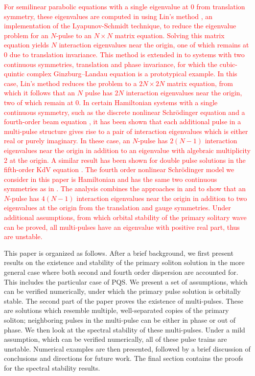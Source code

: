 \documentclass[12pt]{elsarticle}
\newcommand{\revised}[1]{ \textcolor{red}{#1} }
\begin{document}
\revised{For semilinear parabolic equations with a single eigenvalue at 0 from translation symmetry, these eigenvalues are computed in \cite{Sandstede1998} using Lin's method \cite{Lin1990}, an implementation of the Lyapunov-Schmidt technique, to reduce the eigenvalue problem for an $N$-pulse to an $N\times N$ matrix equation. Solving this matrix equation yields $N$ interaction eigenvalues near the origin, one of which remains at 0 due to translation invariance. This method is extended in \cite{Manukian} to systems with two continuous symmetries, translation and phase invariance, for which the cubic-quintic complex Ginzburg–Landau equation is a prototypical example. In this case, Lin's method reduces the problem to a $2N\times 2N$ matrix equation, from which it follows that an $N$ pulse has $2N$ interaction eigenvalues near the origin, two of which remain at 0. In certain Hamiltonian systems with a single continuous symmetry, such as the discrete nonlinear Schr{\"o}dinger equation \cite{Parker2020} and a fourth-order beam equation \cite{Kapitula2020}, it has been shown that each additional pulse in a multi-pulse structure gives rise to a pair of interaction eigenvalues which is either real or purely imaginary. In these case, an $N$-pulse has $2(N-1)$ interaction eigenvalues near the origin in addition to an eigenvalue with algebraic multiplicity 2 at the origin. A similar result has been shown for double pulse solutions in the fifth-order KdV equation \cite{Pelinovsky2007}. The fourth order nonlinear Schr{\"o}dinger model we consider in this paper is Hamiltonian and has the same two continuous symmetries as in \cite{Manukian}. The analysis combines the approaches in \cite{Manukian} and \cite{Parker2020} to show that an $N$-pulse has $4(N-1)$ interaction eigenvalues near the origin in addition to two eigenvalues at the origin from the translation and gauge symmetries. Under additional assumptions, from which orbital stability of the primary solitary wave can be proved, all multi-pulses have an eigenvalue with positive real part, thus are unstable.}

This paper is organized as follows. After a brief background, we first present results on the existence and stability of the primary soliton solution in the more general case where both second and fourth order dispersion are accounted for. This includes the particular case of PQS. We present a set of assumptions, which can be verified numerically, under which the primary pulse solution is orbitally stable. The second part of the paper proves the existence of multi-pulses. These are solutions which resemble multiple, well-separated copies of the primary soliton; neighboring pulses in the multi-pulse can be either in phase or out of phase. We then look at the spectral stability of these multi-pulses. Under a mild assumption, which can be verified numerically, all of these pulse trains are unstable. Numerical examples are then presented, followed by a brief discussion of conclusions and directions for future work. The final section contains the proofs for the spectral stability results.
\end{document}
